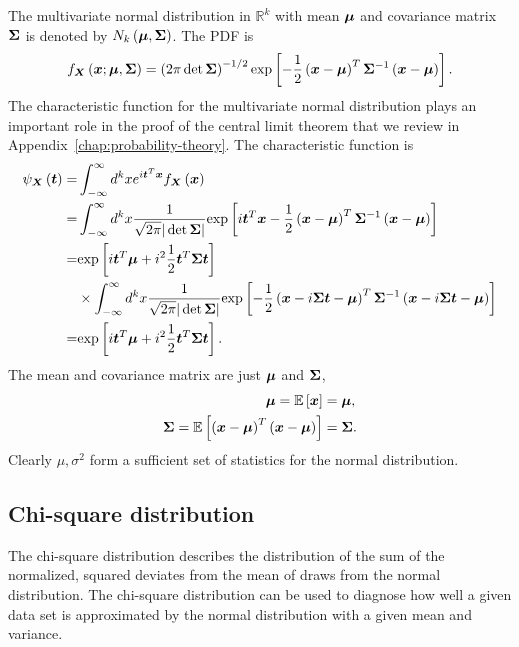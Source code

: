 The multivariate normal distribution in $\mathbb{R}^k$ with mean 
${\bm \mu}$ and covariance matrix ${\bm \Sigma}$ is denoted by $N_k\left({\bm \mu},{\bm \Sigma}\right)$.
The PDF is
\begin{align}
    f_{{\bm X}}\left({\bm x};{\bm \mu},{\bm \Sigma}\right)
    =
    \left(2\pi \det{\bm \Sigma}\right)^{-1/2}
    \mathrm{exp}\left[
        -
        \frac{1}{2}\left({\bm x} - {\bm \mu}\right)^T{\bm \Sigma}^{-1}\left({\bm x} - {\bm \mu}\right)
    \right]
    .
\end{align}
The characteristic function for the multivariate normal distribution plays an important role in the proof of the central limit theorem that we review in Appendix~\ref{chap:probability-theory}. 
The characteristic function is
\begin{align}
    \label{eq:characteristic-function-multivariate-normal}
    \psi_{{\bm X}}\left({\bm t}\right)
    =&
    \int_{-\infty}^{\infty}d^kx 
        e^{i{\bm t}^T{\bm x}}f_{{\bm X}}\left({\bm x}\right)
    \nonumber\\
    =&
    \int_{-\infty}^{\infty}d^kx 
        \frac{1}{\sqrt{2\pi}|\det{\bm \Sigma}|} 
        \mathrm{exp}\left[
            i{\bm t}^T{\bm x}
            -
            \frac{1}{2}\left({\bm x}-{\bm \mu}\right)^T{\bm \Sigma}^{-1}\left({\bm x}-{\bm \mu}\right)
        \right]
    \nonumber\\
    =&
    \mathrm{exp}\left[
        i{\bm t}^T{\bm \mu}
        + 
        i^2\frac{1}{2}{\bm t}^T{\bm \Sigma}{\bm t}
    \right]
    \nonumber\\
    & \times \int_{-\infty}^{\infty}d^kx 
        \frac{1}{\sqrt{2\pi}|\det{\bm \Sigma}|} 
        \mathrm{exp}\left[
            -
            \frac{1}{2}
            \left({\bm x}-i{\bm \Sigma}{\bm t}-{\bm \mu}\right)^T
            {\bm \Sigma}^{-1}
            \left({\bm x}-i{\bm \Sigma}{\bm t}-{\bm \mu}\right)
        \right]
    \nonumber\\
    =&
    \mathrm{exp}\left[
        i{\bm t}^T{\bm \mu} 
        + 
        i^2\frac{1}{2}{\bm t}^T{\bm \Sigma}{\bm t}
    \right]
    .
\end{align}
The mean and covariance matrix are just ${\bm \mu}$ and ${\bm \Sigma}$,
\begin{align}
    {\bm \mu}
    =
    \mathbb{E}\left[{\bm x}\right]
    &=
    {\bm \mu}
    ,\\
    {\bm \Sigma}
    =
    \mathbb{E}\left[\left({\bm x}-{\bm \mu}\right)^T\left({\bm x}-{\bm \mu}\right)\right]
    &=
    {\bm \Sigma}
    .
\end{align}
Clearly $\mu,\sigma^2$ form a sufficient set of statistics for the
normal distribution.
\subsection{Chi-square distribution}
The chi-square distribution describes the distribution of the sum of
the normalized, squared deviates from the mean of draws from the
normal distribution.
The chi-square distribution can be used to diagnose how well a given
data set is approximated by the normal distribution with a given mean and variance.

